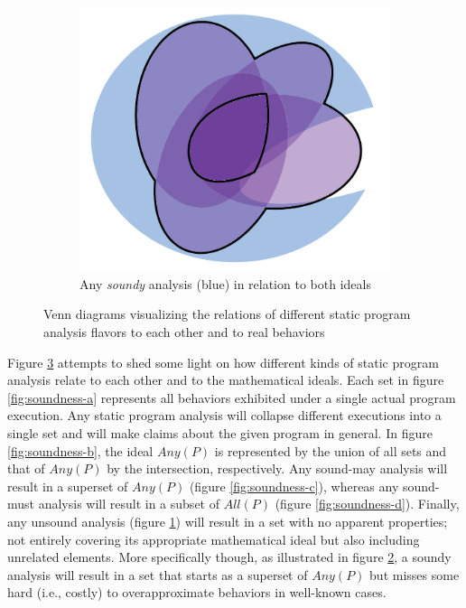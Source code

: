 \begin{figure}[htb!]
\begin{subfigure}{.47\textwidth}
    \label{fig:soundness-e}
\end{subfigure}
\hfill
\begin{subfigure}{.47\textwidth}
    \includegraphics[scale=.45]{assets/intro/venn-soundness-f.pdf}
    \caption{Any \emph{soundy} analysis (blue) in relation to both ideals}
    \label{fig:soundness-f}
\end{subfigure}
\caption{Venn diagrams visualizing the relations of different static program analysis flavors to each other and to real behaviors}
\label{fig:soundness}
\end{figure}

Figure \ref{fig:soundness} attempts to shed some light on how different kinds
of static program analysis relate to each other and to the mathematical ideals.
Each set in figure \ref{fig:soundness-a} represents all behaviors exhibited
under a single actual program execution. Any static program analysis will
collapse different executions into a single set and will make claims about the
given program in general. In figure \ref{fig:soundness-b}, the ideal $Any(P)$
is represented by the union of all sets and that of $Any(P)$ by the
intersection, respectively. Any sound-may analysis will result in a superset of
$Any(P)$ (figure \ref{fig:soundness-c}), whereas any sound-must analysis will
result in a subset of $All(P)$ (figure \ref{fig:soundness-d}). Finally, any
unsound analysis (figure \ref{fig:soundness-e}) will result in a set with no
apparent properties; not entirely covering its appropriate mathematical ideal
but also including unrelated elements. More specifically though, as illustrated
in figure \ref{fig:soundness-f}, a soundy analysis will result in a set that
starts as a superset of $Any(P)$ but misses some hard (i.e., costly) to
overapproximate behaviors in well-known cases.


